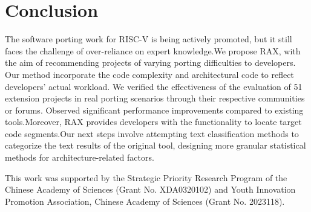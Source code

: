 \documentclass[sigconf,screen,review,anonymous]{acmart}
\begin{document}
\section{Conclusion}
The software porting work for RISC-V is being actively promoted, but it still faces the challenge of over-reliance on expert knowledge.We propose RAX, with the aim of recommending projects of varying porting difficulties to developers. Our method incorporate the code complexity and architectural code to reflect developers' actual workload. We verified the effectiveness of the evaluation of 51 extension projects in real porting scenarios through their respective communities or forums. Observed significant performance improvements compared to existing tools.Moreover, RAX provides developers with the functionality to locate target code segments.Our next steps involve attempting text classification methods to categorize the text results of the original tool, designing more granular statistical methods for architecture-related factors.
\begin{acks}
  This work was supported by the Strategic Priority Research Program of the Chinese Academy of Sciences (Grant No. XDA0320102) and Youth Innovation Promotion Association, Chinese Academy of Sciences (Grant No. 2023118).
\end{acks}



\end{document}
